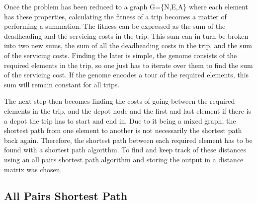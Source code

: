 Once the problem has been reduced to a graph G=\{N,E,A\} where each element has these properties, calculating the fitness of a trip becomes a matter of performing a summation. The fitness can be expressed as the sum of the deadheading and the servicing costs in the trip. This sum can in turn be broken into two new sums, the sum of all the deadheading costs in the trip, and the sum of the servicing costs. Finding the later is simple, the genome consists of the required elements in the trip, so one just has to iterate over them to find the sum of the servicing cost. If the genome encodes a tour of the required elements, this sum will remain constant for all trips.

The next step then becomes finding the costs of going between the required elements in the trip, and the depot node and the first and last element if there is a depot the trip has to start and end in. Due to it being a mixed graph, the shortest path from one element to another is not necessarily the shortest path back again. Therefore, the shortest path between each required element has to be found with a shortest path algorithm. To find and keep track of these distances using an all pairs shortest path algorithm and storing the output in a distance matrix was chosen.


\subsection{All Pairs Shortest Path} %
\label{sub:all_pairs_shortest_path}


